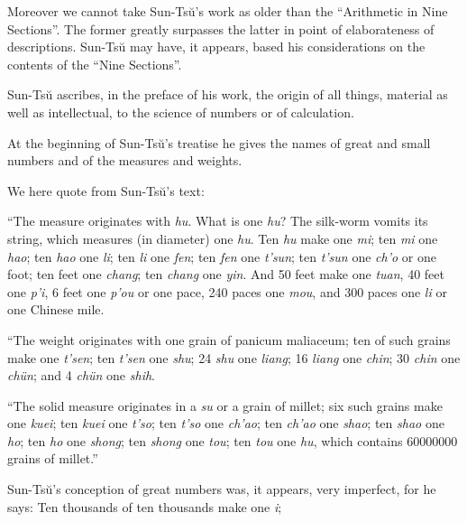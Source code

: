 \documentclass[11pt]{article}
\newcommand{\scanfooter}{}
\begin{document}
Moreover we cannot take Sun-Tsŭ's work as older than the ``Arithmetic in Nine Sections''. The former greatly surpasses the latter in point of elaborateness of descriptions. Sun-Tsŭ may have, it appears, based his considerations on the contents of the ``Nine Sections''.

Sun-Tsŭ ascribes, in the preface of his work, the origin of all things, material as well as intellectual, to the science of numbers or of calculation.

At the beginning of Sun-Tsŭ's treatise he gives the names of great and small numbers and of the measures and weights.

We here quote from Sun-Tsŭ's text:

``The measure originates with \emph{hu}. What is one \emph{hu}? The silk-worm vomits its string, which measures (in diameter) one \emph{hu}. Ten \emph{hu} make one \emph{mi}; ten \emph{mi} one \emph{hao}; ten \emph{hao} one \emph{li}; ten \emph{li} one \emph{fen}; ten \emph{fen} one \emph{t'sun}; ten \emph{t'sun} one \emph{ch'o} or one foot; ten feet one \emph{chang}; ten \emph{chang} one \emph{yin}. And 50 feet make one \emph{tuan}, 40 feet one \emph{p'i}, 6 feet one \emph{p'ou} or one pace, 240 paces one \emph{mou}, and 300 paces one \emph{li} or one Chinese mile.

``The weight originates with one grain of panicum maliaceum; ten of such grains make one \emph{t'sen}; ten \emph{t'sen} one \emph{shu}; 24 \emph{shu} one \emph{liang}; 16 \emph{liang} one \emph{chin}; 30 \emph{chin} one \emph{chün}; and 4 \emph{chün} one \emph{shih}.

``The solid measure originates in a \emph{su} or a grain of millet; six such grains make one \emph{kuei}; ten \emph{kuei} one \emph{t'so}; ten \emph{t'so} one \emph{ch'ao}; ten \emph{ch'ao} one \emph{shao}; ten \emph{shao} one \emph{ho}; ten \emph{ho} one \emph{shong}; ten \emph{shong} one \emph{tou}; ten \emph{tou} one \emph{hu}, which contains 60000000 grains of millet.''

Sun-Tsŭ's conception of great numbers was, it appears, very imperfect, for he says: Ten thousands of ten thousands make one \emph{i};
\scanfooter
\end{document}
